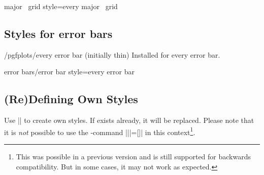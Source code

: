 \pgfplotsshortxystylekey major \x\ grid style=every major \x\ grid\pgfeov

\subsection*{Styles for error bars}

\begin{stylekey}{/pgfplots/every error bar (initially thin)}
 Installed for every error bar. 
\end{stylekey}

\pgfplotsshortstylekey error bars/error bar style=every error bar\pgfeov

\subsection{(Re)Defining Own Styles}
\label{sec:styles:own}%
Use ||
to create own styles. If  exists already, it will be replaced. Please note that it is \emph{not} possible to use the \Tikz-command |\tikzstyle||=[]| in this context\footnote{This was possible in a previous version and is still supported for backwards compatibility. But in some cases, it may not work as expected.}.
\begin{codeexample}[]

\end{codeexample}
